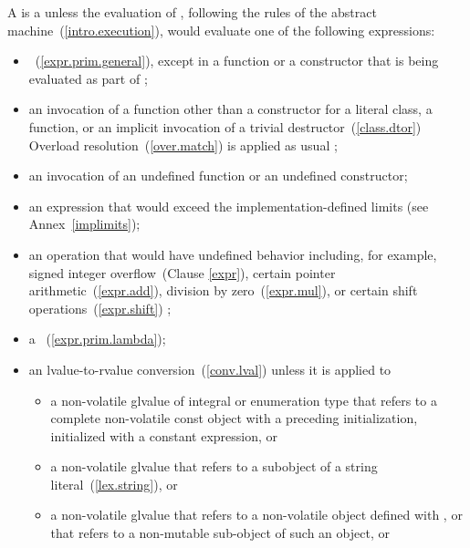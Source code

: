 \pnum
A   is a 
unless the evaluation of , following the rules of the abstract
machine~(\ref{intro.execution}), would evaluate one of the following expressions:

\begin{itemize}
\item
{}~(\ref{expr.prim.general}), except in a 
function or a  constructor that is being evaluated as part
of ;

\item
an invocation of a function other than
a  constructor for a literal class,
a  function,
or an implicit invocation of a trivial destructor~(\ref{class.dtor})
\enternote Overload resolution~(\ref{over.match})
is applied as usual \exitnote;

\item
an invocation of an undefined  function or an
undefined  constructor;

\item
an expression that would exceed the implementation-defined
limits (see Annex~\ref{implimits});

\item
an operation that would have undefined behavior \enternote including,
for example, signed integer overflow~(Clause \ref{expr}), certain
pointer arithmetic~(\ref{expr.add}), division by
zero~(\ref{expr.mul}), or certain shift operations~(\ref{expr.shift})
\exitnote;

\item
a ~(\ref{expr.prim.lambda});

\item
an lvalue-to-rvalue conversion~(\ref{conv.lval}) unless
it is applied to

\begin{itemize}
  \item
  a non-volatile glvalue of integral or enumeration type that refers
  to a complete non-volatile const object with a preceding initialization,
  initialized with a constant expression, or

  \item
  a non-volatile glvalue that refers to a subobject of a string
  literal~(\ref{lex.string}), or

  \item
  a non-volatile glvalue that refers to a non-volatile object
  defined with , or that refers to a non-mutable sub-object
  of such an object, or


\end{itemize}
\end{itemize}
